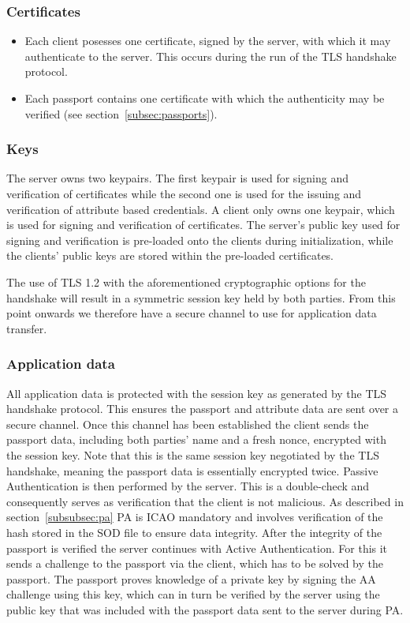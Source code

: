 \subsubsection{Certificates}
\begin{itemize}
	\item Each client posesses one certificate, signed by the server, with which it may authenticate to the server. This occurs during the run of the TLS handshake protocol.
  \item Each passport contains one certificate with which the authenticity may be verified (see section~\ref{subsec:passports}).
\end{itemize}

\subsubsection{Keys}
The server owns two keypairs. The first keypair is used for signing and verification of certificates while the second one is used for the issuing and verification of attribute based credentials. A client only owns one keypair, which is used for signing and verification of certificates. The server's public key used for signing and verification is pre-loaded onto the clients during initialization, while the clients' public keys are stored within the pre-loaded certificates.

The use of TLS 1.2 with the aforementioned cryptographic options for the handshake will result in a symmetric session key held by both parties. From this point onwards we therefore have a secure channel to use for application data transfer.

\subsubsection{Application data}
All application data is protected with the session key as generated by the TLS handshake protocol. This ensures the passport and attribute data are sent over a secure channel. Once this channel has been established the client sends the passport data, including both parties' name and a fresh nonce, encrypted with the session key. Note that this is the same session key negotiated by the TLS handshake, meaning the passport data is essentially encrypted twice. Passive Authentication is then performed by the server. This is a double-check and consequently serves as verification that the client is not malicious. As described in section~\ref{subsubsec:pa} PA is ICAO mandatory and involves verification of the hash stored in the SOD file to ensure data integrity. After the integrity of the passport is verified the server continues with Active Authentication. For this it sends a challenge to the passport via the client, which has to be solved by the passport. The passport proves knowledge of a private key by signing the AA challenge using this key, which can in turn be verified by the server using the public key that was included with the passport data sent to the server during PA.

